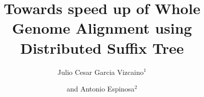 \documentclass[10pt]{bmc_article}
\newenvironment{bmcformat}{\begin{raggedright}\baselineskip20pt\sloppy\setboolean{publ}{false}}{\end{raggedright}\baselineskip20pt\sloppy}
\begin{document}
\begin{bmcformat}



\title{Towards speed up of Whole Genome Alignment using Distributed Suffix Tree}
 


\author{Julio Cesar Garcia Vizcaino\correspondingauthor$^{1}$%
      \and
       and 
         Antonio Espinosa$^2$%
      }
      


\address{%
    \iid(1)Computer Architecture \& Operating Systems Department (CAOS), Universitat Autònoma de Barcelona,%
    Bellaterra (Barcelona), Spain.\\
    \iid(2)Computer Architecture \& Operating Systems Department (CAOS), Universitat Autònoma de Barcelona,%
    Bellaterra (Barcelona), Spain.
}%

\maketitle




\end{bmcformat}
\end{document}
